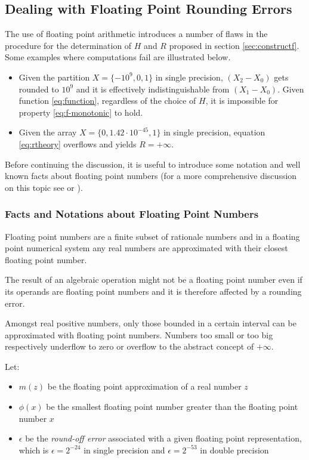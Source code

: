 \documentclass[preprint,1p,times]{elsarticle}
\begin{document}
\subsection{Dealing with Floating Point Rounding Errors}
\label{sec:rounding}

The use of floating point arithmetic introduces a number of flaws in the procedure for the determination of $H$ and $R$ proposed in section \ref{sec:constructf}. 
Some examples where computations fail are illustrated below.
\begin{itemize}
	\item Given the partition $X=\{-10^{9}, 0, 1\}$ in single precision, $(X_2-X_0)$ gets rounded to $10^9$ and it is effectively indistinguishable from $(X_1-X_0)$. Given function \eqref{eq:function}, regardless of the choice of $H$, it is impossible for property \eqref{eq:f-monotonic} to hold.
	\item Given the array $X=\{0, 1.42\!\cdot\! 10^{-45} ,1\}$ in single precision, equation \eqref{eq:rtheory} overflows and yields $R = +\infty$.
\end{itemize}

Before continuing the discussion, it is useful to introduce some notation and well known facts about floating point numbers (for a more comprehensive discussion on this topic see \cite{Johnson1982} or \cite{Goldberg1991}).

\subsubsection{Facts and Notations about Floating Point Numbers}
Floating point numbers are a finite subset of rationale numbers and in a floating point numerical system any real numbers are approximated with their closest floating point number.

The result of an algebraic operation might not be a floating point number even if its operands are floating point numbers and it is therefore affected by a rounding error.

Amongst real positive numbers, only those bounded in a certain interval can be approximated with floating point numbers. Numbers too small or too big respectively underflow to zero or overflow to the abstract concept of $+\infty$.

Let: 
\begin{itemize}
\item $m(z)$ be the floating point approximation of a real number $z$
\item $\phi(x)$ be the smallest floating point number greater than the floating point number $x$
\item $\epsilon$ be the \textit{round-off error} associated with a given floating point representation, which is $\epsilon=2^{-24}$ in single precision and $\epsilon=2^{-53}$ in double precision
\end{itemize}
\end{document}
